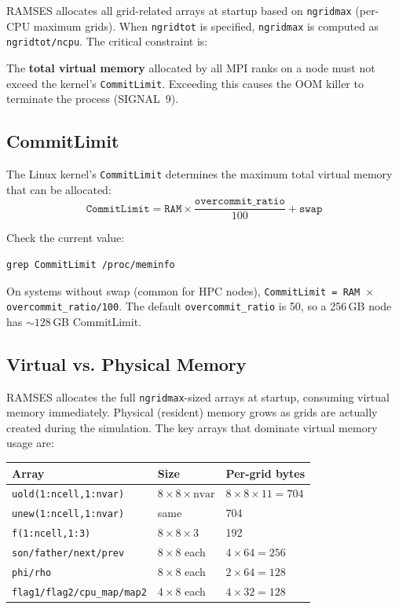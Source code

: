 \documentclass[11pt,fleqn]{book}
\begin{document}
RAMSES allocates all grid-related arrays at startup based on \texttt{ngridmax} (per-CPU maximum grids). When \texttt{ngridtot} is specified, \texttt{ngridmax} is computed as \texttt{ngridtot/ncpu}. The critical constraint is:

\begin{important}
The \textbf{total virtual memory} allocated by all MPI ranks on a node must not exceed the kernel's \texttt{CommitLimit}. Exceeding this causes the OOM killer to terminate the process (SIGNAL~9).
\end{important}

\subsection{CommitLimit}

The Linux kernel's \texttt{CommitLimit} determines the maximum total virtual memory that can be allocated:
\[
\texttt{CommitLimit} = \texttt{RAM} \times \frac{\texttt{overcommit\_ratio}}{100} + \texttt{swap}
\]

Check the current value:
\begin{codebox}
\begin{lstlisting}[style=bash,numbers=none]
grep CommitLimit /proc/meminfo
\end{lstlisting}
\end{codebox}

On systems without swap (common for HPC nodes), \texttt{CommitLimit = RAM $\times$ overcommit\_ratio/100}. The default \texttt{overcommit\_ratio} is 50, so a 256\,GB node has ${\sim}128$\,GB CommitLimit.

\subsection{Virtual vs. Physical Memory}

RAMSES allocates the full \texttt{ngridmax}-sized arrays at startup, consuming virtual memory immediately. Physical (resident) memory grows as grids are actually created during the simulation. The key arrays that dominate virtual memory usage are:

\begin{center}
\begin{tabular}{lll}
\toprule
\textbf{Array} & \textbf{Size} & \textbf{Per-grid bytes} \\
\midrule
\texttt{uold(1:ncell,1:nvar)} & $8 \times 8 \times \text{nvar}$ & $8 \times 8 \times 11 = 704$ \\
\texttt{unew(1:ncell,1:nvar)} & same & 704 \\
\texttt{f(1:ncell,1:3)} & $8 \times 8 \times 3$ & 192 \\
\texttt{son/father/next/prev} & $8 \times 8$ each & $4 \times 64 = 256$ \\
\texttt{phi/rho} & $8 \times 8$ each & $2 \times 64 = 128$ \\
\texttt{flag1/flag2/cpu\_map/map2} & $4 \times 8$ each & $4 \times 32 = 128$ \\
\bottomrule
\end{tabular}
\end{center}
\end{document}
